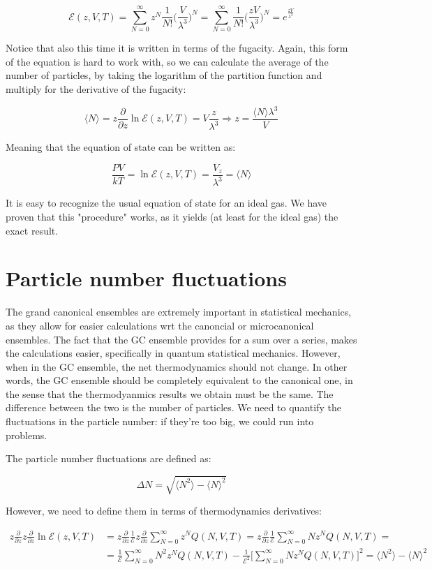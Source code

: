 $$\mathcal{E}(z, V, T) = \sum\limits_{N=0}^{\infty}z^N\frac{1}{N!}\biggl(\frac{V}{\lambda^3}\biggr)^{N} = \sum\limits_{N=0}^{\infty}\frac{1}{N!}\biggl(\frac{zV}{\lambda^3}\biggr)^{N} = e^{\frac{zV}{\lambda^3}}$$

Notice that also this time it is written in terms of the fugacity. 
Again, this form of the equation is hard to work with, so we can calculate the average of the number of particles, by taking the logarithm of the partition function and multiply for the derivative of the fugacity: 

$$\langle N\rangle = z\frac{\partial}{\partial z}\ln\mathcal{E}(z, V, T) = V\frac{z}{\lambda^3}\Rightarrow z = \frac{\langle N\rangle\lambda^3}{V}$$

Meaning that the equation of state can be written as:

$$\frac{PV}{kT} = \ln\mathcal{E}(z, V, T) = \frac{V_z}{\lambda^3}= \langle N\rangle$$

It is easy to recognize the usual equation of state for an ideal gas.
We have proven that this "procedure" works, as it yields (at least for the ideal gas) the exact result. 

\section{Particle number fluctuations}
The grand canonical ensembles are extremely important in statistical mechanics, as they allow for easier calculations wrt the canoncial or microcanonical ensembles.
The fact that the GC ensemble provides for a sum over a series, makes the calculations easier, specifically in quantum statistical mechanics.
However, when in the GC ensemble, the net thermodynamics should not change. 
In other words, the GC ensemble should be completely equivalent to the canonical one, in the sense that the thermodyanmics results we obtain must be the same.
The difference between the two is the number of particles.
We need to quantify the fluctuations in the particle number: if they're too big, we could run into problems. 

The particle number fluctuations are defined as:

	$$\Delta N = \sqrt{\langle N^2\rangle-\langle N\rangle^2}$$
	
	However, we need to define them in terms of thermodynamics derivatives:

	\begin{align*}
		z\frac{\partial}{\partial z}z\frac{\partial}{\partial z}\ln\mathcal{E}(z, V, T) &= z\frac{\partial}{\partial z}\frac{1}{\mathcal{E}}z\frac{\partial}{\partial z}\sum\limits_{N=0}^{\infty}z^NQ(N, V, T) = z\frac{\partial}{\partial z}\frac{1}{\mathcal{E}}\sum\limits_{N=0}^{\infty}Nz^N Q(N, V, T)=\\
																																										&=\frac{1}{\mathcal{E}}\sum\limits_{N=0}^{\infty}N^2z^NQ(N, V, T)-\frac{1}{\mathcal{E}^2}\biggl[\sum\limits_{N=0}^{\infty}Nz^NQ(N, V, T)\biggr]^2 = \langle N^2\rangle - \langle N\rangle^2
	\end{align*}

